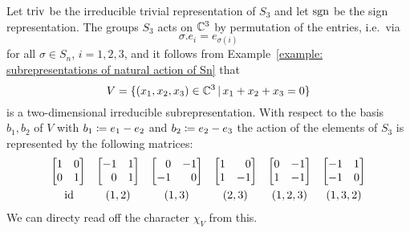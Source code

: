 \begin{example}
  \label{example: character table S3}
  Let $\operatorname{triv}$ be the irreducible trivial representation of $S_3$ and let $\operatorname{sgn}$ be the sign representation.
  The groups $S_3$ acts on $\mathbb{C}^3$ by permutation of the entries, i.e.\ via
  \[
      \sigma.e_i
    = e_{\sigma(i)}
  \]
  for all $\sigma \in S_n$, $i = 1, 2, 3$, and it follows from Example~\ref{example: subrepresentations of natural action of Sn} that
  \[
        V
    = \{
        (x_1, x_2, x_3) \in \Complex^3
      \suchthat
        x_1 + x_2 + x_3 = 0
      \}
  \]
  is a two-dimensional irreducible subrepresentation.
  With respect to the basis $b_1, b_2$ of $V$ with $b_1 \coloneqq e_1 - e_2$ and $b_2 \coloneqq e_2 - e_3$ the action of the elements of $S_3$ is represented by the following matrices:
  \begin{equation}
    \label{equation: representing matrix for 2dim irrep of S3}
    \begin{array}{cccccc}
        \begin{bmatrix*}[r]
          1 & 0 \\
          0 & 1
        \end{bmatrix*}
      & \begin{bmatrix*}[r]
          -1  & 1 \\
           0  & 1
        \end{bmatrix*}
      & \begin{bmatrix*}[r]
           0  & -1  \\
          -1  &  0
        \end{bmatrix*}
      & \begin{bmatrix*}[r]
          1 &  0 \\
          1 & -1
        \end{bmatrix*}
      & \begin{bmatrix*}[r]
          0 & -1 \\
          1 & -1
        \end{bmatrix*}
      & \begin{bmatrix*}[r]
          -1  & 1 \\
          -1  & 0
        \end{bmatrix*}
      \\
        \rule{0pt}{1.2em}
        \id
      & (1,2)
      & (1,3)
      & (2,3)
      & (1,2,3)
      & (1,3,2)
    \end{array}
  \end{equation}
  We can directy read off the character $\chi_V$ from this.

\end{example}
